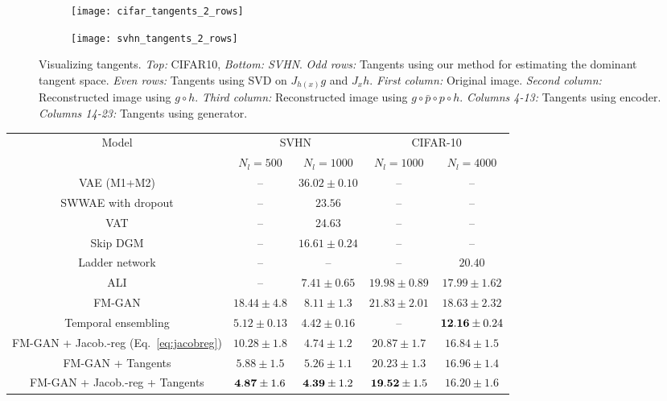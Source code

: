 \documentclass{article}
\begin{document}
\begin{figure}[t]
    \centering
    \begin{subfigure}[t]{\textwidth}
        \centering
        \texttt{[image: cifar\_tangents\_2\_rows]}
    \end{subfigure}
    
    \begin{subfigure}[t]{\textwidth}
        \centering
        \texttt{[image: svhn\_tangents\_2\_rows]}
    \end{subfigure}
    \caption{Visualizing tangents. \emph{Top:} CIFAR10, \emph{Bottom: SVHN}. \emph{Odd rows:} Tangents using our method for estimating the dominant tangent space. \emph{Even rows:} Tangents using SVD on $J_{h(x)} g$ and $J_x h$. \emph{First column:} Original image. \emph{Second column:} Reconstructed image using $g \circ h$. \emph{Third column:} Reconstructed image using $g\circ \bar{p} \circ p \circ h$. \emph{Columns 4-13:} Tangents using encoder. \emph{Columns 14-23:} Tangents using generator.}
    \label{tans}
    \vspace{-4mm}
\end{figure}\begin{table}[t]
\centering
\begin{tabular}{c c c c  c  }
\toprule
\multirow{ 2}{*}{Model} & \multicolumn{2}{c}{~~~SVHN~~~}  & \multicolumn{2}{c}{CIFAR-10} \\
& {$N_l = 500$} & {$N_l=1000$} & {$N_l=1000$} & {$N_l=4000$} \\
\midrule
VAE (M1+M2) \cite{kingma2014semi} & --  & $36.02\pm 0.10$ & -- & --  \\
SWWAE with dropout \cite{zhao2015stacked} & --  & $23.56$ & -- & --  \\
VAT \cite{miyato2015distributional} & --  & 24.63 & -- & --  \\
Skip DGM \cite{maaloe2016auxiliary} & --  & $16.61\pm 0.24$ & -- & --  \\
Ladder network \cite{rasmus2015semi} & -- & -- & -- & $20.40$ \\
ALI \cite{dumoulin2016adversarially} &  -- & $7.41 \pm 0.65$ & $19.98\pm 0.89$ & $17.99\pm 1.62$  \\
FM-GAN \cite{salimans2016improved} & $18.44\pm 4.8$  & $8.11\pm 1.3$ & $21.83\pm 2.01$ & $18.63 \pm 2.32$  \\
Temporal ensembling \cite{laine2016temporal} & $5.12\pm 0.13$ & $4.42\pm 0.16$ & -- & ${\bf 12.16}\pm 0.24$ \\
FM-GAN + Jacob.-reg (Eq.~\eqref{eq:jacobreg}) & $10.28\pm 1.8$  & $4.74\pm 1.2$ & $20.87\pm 1.7$ &  $16.84\pm 1.5$ \\
FM-GAN + Tangents  & $5.88\pm 1.5$  & $5.26\pm 1.1$  & $20.23\pm 1.3$ & $16.96 \pm 1.4$  \\
FM-GAN + Jacob.-reg + Tangents  & ${\bf 4.87} \pm 1.6$   & ${\bf 4.39} \pm 1.2$ & ${\bf 19.52}\pm 1.5$ & ${16.20}\pm 1.6$  \\


\end{tabular}
\end{table}
\end{document}
